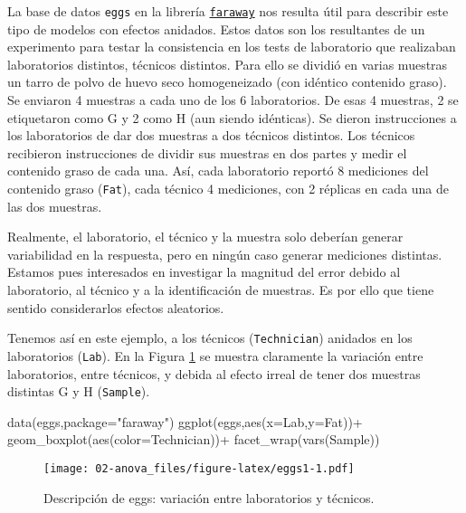 \documentclass[
]{book}
\newenvironment{Shaded}{\begin{snugshade}}{\end{snugshade}}
\newcommand{\AttributeTok}[1]{\textcolor[rgb]{0.77,0.63,0.00}{#1}}
\newcommand{\FunctionTok}[1]{\textcolor[rgb]{0.00,0.00,0.00}{#1}}
\newcommand{\NormalTok}[1]{#1}
\newcommand{\SpecialCharTok}[1]{\textcolor[rgb]{0.00,0.00,0.00}{#1}}
\newcommand{\StringTok}[1]{\textcolor[rgb]{0.31,0.60,0.02}{#1}}
\begin{document}
La base de datos \texttt{eggs} en la librería \href{https://cran.r-project.org/web/packages/faraway/faraway.pdf}{\texttt{faraway}} nos resulta útil para describir este tipo de modelos con efectos anidados. Estos datos son los resultantes de un experimento para testar la consistencia en los tests de laboratorio que realizaban laboratorios distintos, técnicos distintos. Para ello se dividió en varias muestras un tarro de polvo de huevo seco homogeneizado (con idéntico contenido graso). Se enviaron 4 muestras a cada uno de los 6 laboratorios. De esas 4 muestras, 2 se etiquetaron como G y 2 como H (aun siendo idénticas). Se dieron instrucciones a los laboratorios de dar dos muestras a dos técnicos distintos. Los técnicos recibieron instrucciones de dividir sus muestras en dos partes y medir el contenido graso de cada una. Así, cada laboratorio reportó 8 mediciones del contenido graso (\texttt{Fat}), cada técnico 4 mediciones, con 2 réplicas en cada una de las dos muestras.

Realmente, el laboratorio, el técnico y la muestra solo deberían generar variabilidad en la respuesta, pero en ningún caso generar mediciones distintas. Estamos pues interesados en investigar la magnitud del error debido al laboratorio, al técnico y a la identificación de muestras. Es por ello que tiene sentido considerarlos efectos aleatorios.

Tenemos así en este ejemplo, a los técnicos (\texttt{Technician}) anidados en los laboratorios (\texttt{Lab}). En la Figura \ref{fig:eggs1} se muestra claramente la variación entre laboratorios, entre técnicos, y debida al efecto irreal de tener dos muestras distintas G y H (\texttt{Sample}).

\begin{Shaded}
\begin{Highlighting}[]
\FunctionTok{data}\NormalTok{(eggs,}\AttributeTok{package=}\StringTok{"faraway"}\NormalTok{)}
\FunctionTok{ggplot}\NormalTok{(eggs,}\FunctionTok{aes}\NormalTok{(}\AttributeTok{x=}\NormalTok{Lab,}\AttributeTok{y=}\NormalTok{Fat))}\SpecialCharTok{+}
  \FunctionTok{geom\_boxplot}\NormalTok{(}\FunctionTok{aes}\NormalTok{(}\AttributeTok{color=}\NormalTok{Technician))}\SpecialCharTok{+}
  \FunctionTok{facet\_wrap}\NormalTok{(}\FunctionTok{vars}\NormalTok{(Sample))}
\end{Highlighting}
\end{Shaded}

\begin{figure}
\centering
\texttt{[image: 02-anova\_files/figure-latex/eggs1-1.pdf]}
\caption{\label{fig:eggs1}Descripción de eggs: variación entre laboratorios y técnicos.}
\end{figure}
\end{document}
